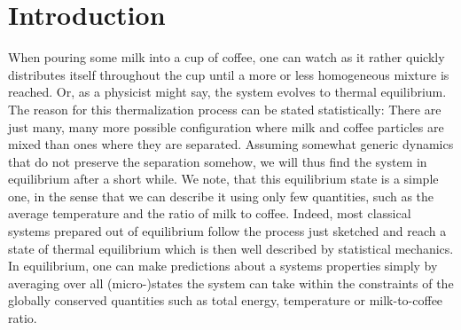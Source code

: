 \chapter*{Introduction}
\label{pt:introduction}
When pouring some milk into a cup of coffee, one can watch as it rather quickly distributes itself throughout the cup until a more or less homogeneous mixture is reached. Or, as a physicist might say, the system evolves to thermal equilibrium. The reason for this thermalization process can be stated statistically: There are just many, many more possible configuration where milk and coffee particles are mixed than ones where they are separated. Assuming somewhat generic dynamics that do not preserve the separation somehow, we will thus find the system in equilibrium after a short while. We note, that this equilibrium state is a simple one, in the sense that we can describe it using only few quantities, such as the average temperature and the ratio of milk to coffee.
Indeed, most classical systems prepared out of equilibrium follow the process just sketched  and reach a state of thermal equilibrium which is then well described by statistical mechanics. In equilibrium, one can make predictions about a systems properties simply by averaging over all (micro-)states the system can take within the constraints of the globally conserved quantities such as total energy, temperature or milk-to-coffee ratio. 

